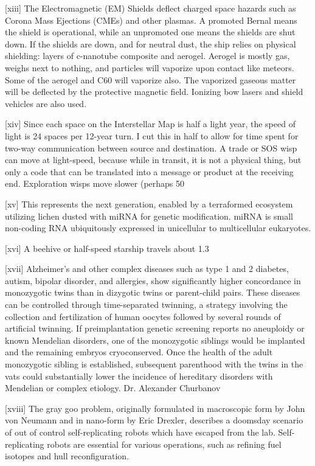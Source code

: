 \documentclass[a4paper]{book}
\begin{document}
[xiii] The Electromagnetic (EM) Shields deflect charged space hazards such as Corona Mass Ejections (CMEs) and other plasmas. A promoted Bernal means the shield is operational, while an unpromoted one means the shields are shut down. If the shields are down, and for neutral dust, the ship relies on physical shielding: layers of c-nanotube composite and aerogel. Aerogel is mostly gas, weighs next to nothing, and particles will vaporize upon contact like meteors. Some of the aerogel and C60 will vaporize also. The vaporized gaseous matter will be deflected by the protective magnetic field. Ionizing bow lasers and shield vehicles are also used.
 
[xiv] Since each space on the Interstellar Map is half a light year, the speed of light is 24 spaces per 12-year turn. I cut this in half to allow for time spent for two-way communication between source and destination. A trade or SOS wisp can move at light-speed, because while in transit, it is not a physical thing, but only a code that can be translated into a message or product at the receiving end. Exploration wisps move slower (perhaps 50%
 
[xv] This represents the next generation, enabled by a terraformed ecosystem utilizing lichen dusted with miRNA for genetic modification. miRNA is small non-coding RNA ubiquitously expressed in unicellular to multicellular eukaryotes.
 
[xvi] A beehive or half-speed starship travels about 1.3%
 
[xvii] Alzheimer’s and other complex diseases such as type 1 and 2 diabetes, autism, bipolar disorder, and allergies, show significantly higher concordance in monozygotic twins than in dizygotic twins or parent-child pairs. These diseases can be controlled through time-separated twinning, a strategy involving the collection and fertilization of human oocytes followed by several rounds of artificial twinning. If preimplantation genetic screening reports no aneuploidy or known Mendelian disorders, one of the monozygotic siblings would be implanted and the remaining embryos cryoconserved. Once the health of the adult monozygotic sibling is established, subsequent parenthood with the twins in the vats could substantially lower the incidence of hereditary disorders with Mendelian or complex etiology. Dr. Alexander Churbanov
 
[xviii] The gray goo problem, originally formulated in macroscopic form by John von Neumann and in nano-form by Eric Drexler, describes a doomsday scenario of out of control self-replicating robots which have escaped from the lab. Self-replicating robots are essential for various operations, such as refining fuel isotopes and hull reconfiguration.
 
\end{document}
